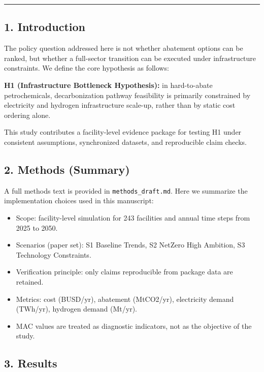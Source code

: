 \documentclass[
]{article}
\providecommand{\tightlist}{%
  \setlength{\itemsep}{0pt}\setlength{\parskip}{0pt}}
\begin{document}
\begin{center}\rule{0.5\linewidth}{0.5pt}\end{center}

\subsection{1. Introduction}\label{1-introduction}

The policy question addressed here is not whether abatement options can
be ranked, but whether a full-sector transition can be executed under
infrastructure constraints. We define the core hypothesis as follows:

\textbf{H1 (Infrastructure Bottleneck Hypothesis):} in hard-to-abate
petrochemicals, decarbonization pathway feasibility is primarily
constrained by electricity and hydrogen infrastructure scale-up, rather
than by static cost ordering alone.

This study contributes a facility-level evidence package for testing H1
under consistent assumptions, synchronized datasets, and reproducible
claim checks.

\subsection{2. Methods (Summary)}\label{2-methods-summary}

A full methods text is provided in \texttt{methods\_draft.md}. Here we
summarize the implementation choices used in this manuscript:

\begin{itemize}
\tightlist
\item
  Scope: facility-level simulation for 243 facilities and annual time
  steps from 2025 to 2050.
\item
  Scenarios (paper set): S1 Baseline Trends, S2 NetZero High Ambition,
  S3 Technology Constraints.
\item
  Verification principle: only claims reproducible from package data are
  retained.
\item
  Metrics: cost (BUSD/yr), abatement (MtCO2/yr), electricity demand
  (TWh/yr), hydrogen demand (Mt/yr).
\item
  MAC values are treated as diagnostic indicators, not as the objective
  of the study.
\end{itemize}

\subsection{3. Results}\label{3-results}
\end{document}
